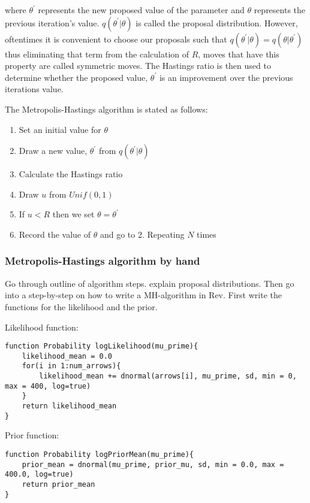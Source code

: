 where $\theta^\prime$ represents the new proposed value of the parameter and $\theta$ represents the previous iteration's value. $q(\theta^\prime | \theta)$ is called the proposal distribution. However, oftentimes it is convenient to choose our proposals such that $ q(\theta^\prime | \theta) = q(\theta | \theta^\prime)$ thus eliminating that term from the calculation of $R$, moves that have this property are called symmetric moves. The Hastings ratio is then used to determine whether the proposed value, $\theta^\prime$ is an improvement over the previous iterations value. 

The Metropolis-Hastings algorithm is stated as follows:
\begin{enumerate}
\item Set an initial value for $\theta$
\item Draw a new value, $\theta^\prime$ from $q(\theta^\prime | \theta)$
\item Calculate the Hastings ratio
\item Draw $u$ from $Unif(0,1)$ 
\item If $u < R$ then we set $\theta = \theta^\prime$ 
\item Record the value of $\theta$ and go to 2. Repeating $N$ times
\end{enumerate}



\subsubsection{Metropolis-Hastings algorithm by hand}

Go through outline of algorithm steps. explain proposal distributions. Then go into a step-by-step on how to write a MH-algorithm in Rev. First write the functions for the likelihood and the prior. 

Likelihood function:

{\tt \begin{snugshade*}
\begin{lstlisting}
function Probability logLikelihood(mu_prime){
	likelihood_mean = 0.0
	for(i in 1:num_arrows){
		likelihood_mean += dnormal(arrows[i], mu_prime, sd, min = 0, max = 400, log=true)
	}
	return likelihood_mean
}
\end{lstlisting}
\end{snugshade*}}

Prior function: 

{\tt \begin{snugshade*}
 \begin{lstlisting}
function Probability logPriorMean(mu_prime){
	prior_mean = dnormal(mu_prime, prior_mu, sd, min = 0.0, max = 400.0, log=true)
	return prior_mean
}
\end{lstlisting}
\end{snugshade*}}



